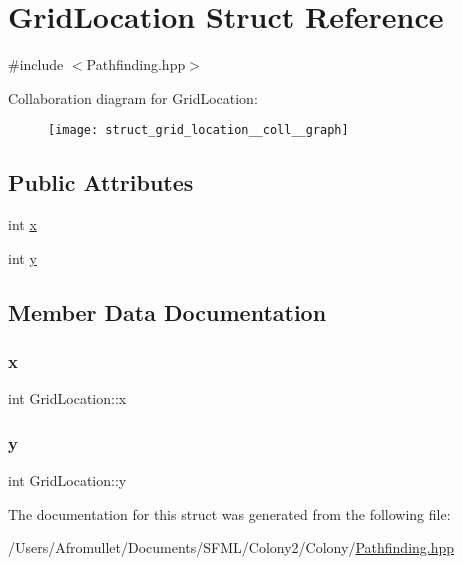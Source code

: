 \hypertarget{struct_grid_location}{}\section{Grid\+Location Struct Reference}
\label{struct_grid_location}


{\ttfamily \#include $<$Pathfinding.\+hpp$>$}



Collaboration diagram for Grid\+Location\+:
\nopagebreak
\begin{figure}[H]
\begin{center}
\leavevmode
\texttt{[image: struct\_grid\_location\_\_coll\_\_graph]}
\end{center}
\end{figure}
\subsection*{Public Attributes}
\begin{DoxyCompactItemize}
\item 
int \mbox{\hyperlink{struct_grid_location_aeb63882b21b183e7335258a58c8a40e8}{x}}
\item 
int \mbox{\hyperlink{struct_grid_location_aa73f11982d6425de33e1cd4a5a4c7ac6}{y}}
\end{DoxyCompactItemize}


\subsection{Member Data Documentation}
\mbox{\label{struct_grid_location_aeb63882b21b183e7335258a58c8a40e8}} 
\subsubsection{\texorpdfstring{x}{x}}
{\footnotesize\ttfamily int Grid\+Location\+::x}

\mbox{\label{struct_grid_location_aa73f11982d6425de33e1cd4a5a4c7ac6}} 
\subsubsection{\texorpdfstring{y}{y}}
{\footnotesize\ttfamily int Grid\+Location\+::y}



The documentation for this struct was generated from the following file\+:\begin{DoxyCompactItemize}
\item 
/\+Users/\+Afromullet/\+Documents/\+S\+F\+M\+L/\+Colony2/\+Colony/\mbox{\hyperlink{_pathfinding_8hpp}{Pathfinding.\+hpp}}\end{DoxyCompactItemize}
